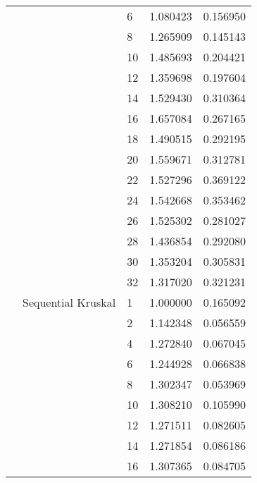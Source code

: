 \begin{tabular}{lllrr}
                      &                     & 6  &  1.080423 &  0.156950 \\
                      &                     & 8  &  1.265909 &  0.145143 \\
                      &                     & 10 &  1.485693 &  0.204421 \\
                      &                     & 12 &  1.359698 &  0.197604 \\
                      &                     & 14 &  1.529430 &  0.310364 \\
                      &                     & 16 &  1.657084 &  0.267165 \\
                      &                     & 18 &  1.490515 &  0.292195 \\
                      &                     & 20 &  1.559671 &  0.312781 \\
                      &                     & 22 &  1.527296 &  0.369122 \\
                      &                     & 24 &  1.542668 &  0.353462 \\
                      &                     & 26 &  1.525302 &  0.281027 \\
                      &                     & 28 &  1.436854 &  0.292080 \\
                      &                     & 30 &  1.353204 &  0.305831 \\
                      &                     & 32 &  1.317020 &  0.321231 \\
                      & Sequential Kruskal & 1  &  1.000000 &  0.165092 \\
                      &                     & 2  &  1.142348 &  0.056559 \\
                      &                     & 4  &  1.272840 &  0.067045 \\
                      &                     & 6  &  1.244928 &  0.066838 \\
                      &                     & 8  &  1.302347 &  0.053969 \\
                      &                     & 10 &  1.308210 &  0.105990 \\
                      &                     & 12 &  1.271511 &  0.082605 \\
                      &                     & 14 &  1.271854 &  0.086186 \\
                      &                     & 16 &  1.307365 &  0.084705 \\

\end{tabular}
